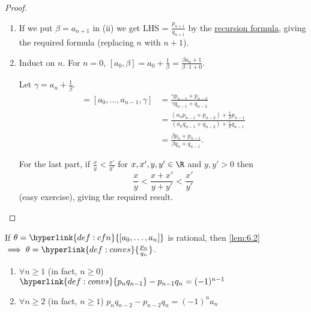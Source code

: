 \documentclass{article}
\begin{document}
\begin{proof}
    \leavevmode
    \begin{enumerate}[label=(\roman*)]
        \item If we put $\beta = a_{n+1}$ in (ii) we get LHS = $\frac{p_{n+1}}{q_{n+1}}$ by the \hyperlink{def:convs}{recursion formula}, giving the required formula (replacing $n$ with $n+1$).
        \item Induct on $n$. For $n=0$, $[a_0, \beta] = a_0 + \frac{1}{\beta} = \frac{\beta a_0 + 1}{\beta \cdot 1 + 0}$.

            Let $\gamma = a_n + \frac{1}{\beta}$.
            \begin{align*}
                [a_0, \dotsc, a_n, \beta] = [a_0, \dotsc, a_{n-1}, \gamma] &= \frac{\gamma p_{n-1} + p_{n-2}}{\gamma q_{n-1} + q_{n-2}} \\
                                                                           &= \frac{(a_n p_{n-1} + p_{n-2}) + \frac{1}{\beta} p_{n-1}}{(a_n q_{n-1} + q_{n-2}) + \frac{1}{\beta} q_{n-1}} \\
                                                                           &= \frac{\beta p_n + p_{n-1}} {\beta q_n + q_{n-1}}.
            \end{align*}

            For the last part, if $\frac{x}{y} < \frac{x'}{y'}$ for $x, x', y, y' \in \R$ and $y, y' > 0$ then
            \begin{equation*}
                \frac{x}{y} < \frac{x+x'}{y+y'} < \frac{x'}{y'}
            \end{equation*}
            (easy exercise), giving the required result. \qedhere
    \end{enumerate}
\end{proof}

If $\theta = \hyperlink{def:cfn}{[a_0, \dotsc, a_n]}$ is rational, then \cref{lem:6.2} $\implies \theta = \hyperlink{def:convs}{\frac{p_n}{q_n}}$.

\begin{nlemma}\label{lem:6.3}
    \leavevmode
    \begin{enumerate}[label=(\roman*)]
        \item $\forall n \geq 1$ (in fact, $n \geq 0$) $\hyperlink{def:convs}{p_n q_{n-1}} - p_{n-1} q_n = (-1)^{n-1}$
        \item $\forall n \geq 2$ (in fact, $n \geq 1$) $p_n q_{n-2} - p_{n-2} q_n = (-1)^n a_n$
    \end{enumerate}
\end{nlemma}
\end{document}
